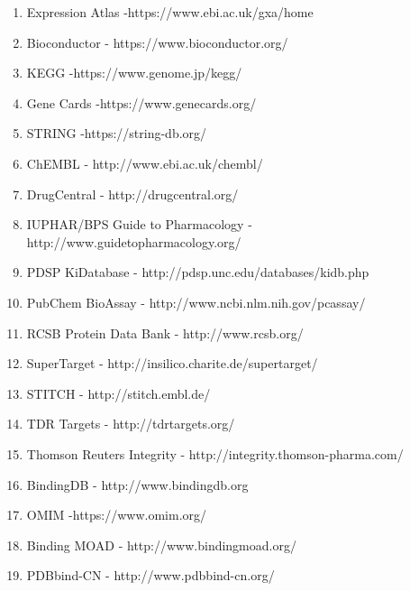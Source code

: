 \begin{enumerate}
	\item Expression Atlas -https://www.ebi.ac.uk/gxa/home
	\item Bioconductor - https://www.bioconductor.org/
	\item KEGG -https://www.genome.jp/kegg/
	\item Gene Cards -https://www.genecards.org/
	\item STRING -https://string-db.org/
	\item ChEMBL - http://www.ebi.ac.uk/chembl/ 
	\item DrugCentral - http://drugcentral.org/ 
	\item IUPHAR/BPS Guide to Pharmacology - http://www.guidetopharmacology.org/ 
	\item PDSP KiDatabase - http://pdsp.unc.edu/databases/kidb.php 
	\item PubChem BioAssay - http://www.ncbi.nlm.nih.gov/pcassay/
	\item RCSB Protein Data Bank - http://www.rcsb.org/ 
	\item SuperTarget - http://insilico.charite.de/supertarget/ 
	\item STITCH - http://stitch.embl.de/ 
	\item TDR Targets - http://tdrtargets.org/ 
	\item Thomson Reuters Integrity - http://integrity.thomson-pharma.com/ 
	\item BindingDB - http://www.bindingdb.org 
	\item OMIM -https://www.omim.org/
	\item Binding MOAD - http://www.bindingmoad.org/ 
	\item PDBbind-CN - http://www.pdbbind-cn.org/ 
\end{enumerate}
